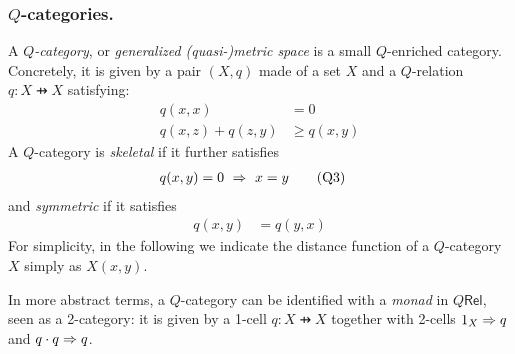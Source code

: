 %
%
%

\subsubsection{$Q$-categories.}


A \emph{$Q$-category}, or \emph{generalized (quasi-)metric space} is a small $Q$-enriched category. Concretely, it is given by a pair $(X,q)$ made of a set $X$ and a $Q$-relation $q: X\pfun X$ satisfying:
\begin{align}
q(x,x) & = 0 \tag{Q1} \\
q(x,z)+q(z,y) & \geq q(x,y) \tag{Q2}
\end{align}
A $Q$-category is \emph{skeletal} if it further satisfies
\begin{align}
q(x,y) & = 0 \ \Rightarrow \ x=y \tag{Q3}
 \end{align}
 and \emph{symmetric} if it satisfies
 \begin{align}
q(x,y) & = q(y,x) \tag{Q4}
 \end{align}
For simplicity, in the following we indicate the distance function of a $Q$-category $X$ simply as $X(x,y)$. 

\begin{remark}
In more abstract terms, a $Q$-category can be identified with a \emph{monad} in $Q\mathsf{Rel}$, seen as a 2-category: it is given by a 1-cell $q:X\pfun X$ together with 2-cells $1_{X}\Rightarrow  q$ and $q\cdot q \Rightarrow q$. 
\end{remark}


